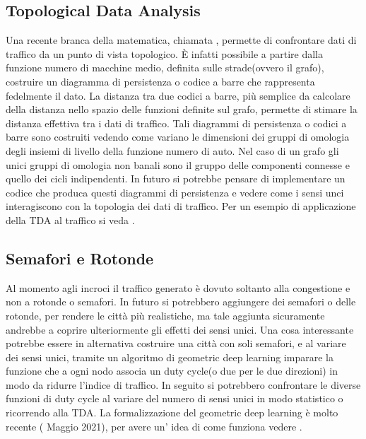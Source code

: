 \documentclass[main.tex]{subfiles}
\begin{document}
\subsection{Topological Data Analysis}
Una recente branca della matematica, chiamata , permette di confrontare dati di traffico da un punto di vista topologico.
\`{E} infatti possibile a partire dalla funzione numero di macchine medio, definita sulle strade(ovvero il grafo), costruire un diagramma di persistenza o codice a 
barre che rappresenta fedelmente il dato. La distanza tra due codici a barre, più semplice da calcolare della distanza nello spazio delle funzioni definite sul grafo,
permette di stimare la distanza effettiva tra i dati di traffico. Tali diagrammi di persistenza o codici a barre sono costruiti vedendo come variano le dimensioni dei gruppi di omologia
degli insiemi di livello della funzione numero di auto. Nel caso di un grafo gli unici gruppi di omologia non banali sono il gruppo delle componenti connesse e quello dei cicli indipendenti.
In futuro si potrebbe pensare di implementare un codice che produca questi diagrammi di persistenza e vedere come i sensi unci interagiscono con la topologia dei dati di traffico.
Per un esempio di applicazione della TDA al traffico si veda \cite{barcodes}.

\subsection{Semafori e Rotonde}
Al momento agli incroci il traffico generato è dovuto soltanto alla congestione e non a rotonde o semafori.
In futuro si potrebbero aggiungere dei semafori o delle rotonde, per rendere le città più realistiche, ma tale aggiunta
sicuramente andrebbe a coprire ulteriormente gli effetti dei sensi unici.
Una cosa interessante potrebbe essere in alternativa costruire una città con soli semafori, e al variare dei sensi unici,
tramite un algoritmo di geometric deep learning imparare la funzione che a ogni nodo associa un duty cycle(o due per le due direzioni) in modo 
da ridurre l'indice di traffico. In seguito si potrebbero confrontare le diverse funzioni di duty cycle al variare del numero di sensi unici in modo statistico
o ricorrendo alla TDA.
La formalizzazione del geometric deep learning è molto recente ( Maggio 2021), per avere un' idea di come funziona vedere \cite{2021geo}.
\end{document}
